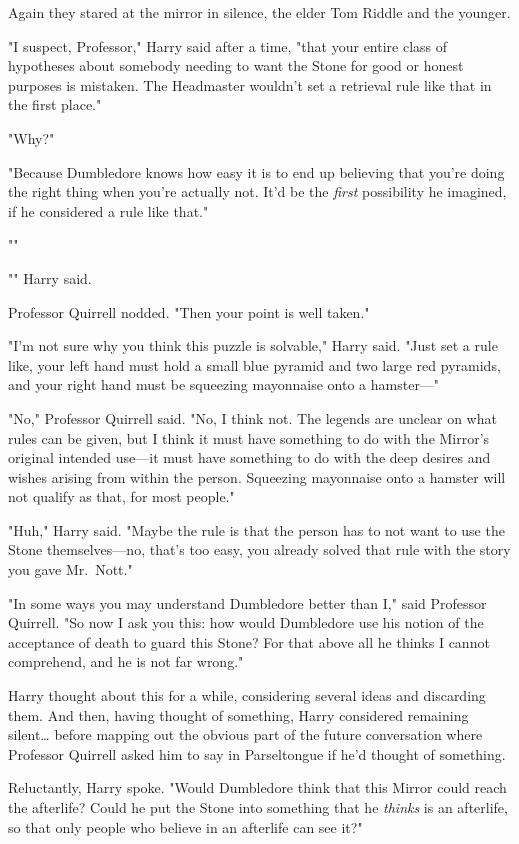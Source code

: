 Again they stared at the mirror in silence, the elder Tom Riddle and the 
younger.

"I suspect, Professor," Harry said after a time, "that your entire class of 
hypotheses about somebody needing to want the Stone for good or honest purposes 
is mistaken. The Headmaster wouldn't set a retrieval rule like that in the 
first place."

"Why?"

"Because Dumbledore knows how easy it is to end up believing that you're doing 
the right thing when you're actually not. It'd be the \emph{first} possibility 
he imagined, if he considered a rule like that."

""

"" Harry said.

Professor Quirrell nodded. "Then your point is well taken."

"I'm not sure why you think this puzzle is solvable," Harry said. "Just set a 
rule like, your left hand must hold a small blue pyramid and two large red 
pyramids, and your right hand must be squeezing mayonnaise onto a hamster---"

"No," Professor Quirrell said. "No, I think not. The legends are unclear on 
what rules can be given, but I think it must have something to do with the 
Mirror's original intended use---it must have something to do with the deep 
desires and wishes arising from within the person. Squeezing mayonnaise onto a 
hamster will not qualify as that, for most people."

"Huh," Harry said. "Maybe the rule is that the person has to not want to use 
the Stone themselves---no, that's too easy, you already solved that rule with 
the story you gave Mr.~Nott."

"In some ways you may understand Dumbledore better than I," said Professor 
Quirrell. "So now I ask you this: how would Dumbledore use his notion of the 
acceptance of death to guard this Stone? For that above all he thinks I cannot 
comprehend, and he is not far wrong."

Harry thought about this for a while, considering several ideas and discarding 
them. And then, having thought of something, Harry considered remaining 
silent{\ldots} before mapping out the obvious part of the future conversation 
where Professor Quirrell asked him to say in Parseltongue if he'd thought of 
something.

Reluctantly, Harry spoke. "Would Dumbledore think that this Mirror could reach 
the afterlife? Could he put the Stone into something that he \emph{thinks} is 
an afterlife, so that only people who believe in an afterlife can see it?"

